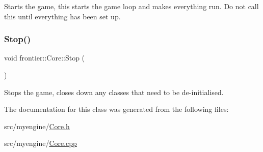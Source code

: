 Starts the game, this starts the game loop and makes everything run. Do not call this until everything has been set up. 

\mbox{\label{classfrontier_1_1_core_af73d19f41d8316a7e0a6e11137201ed9}} 
\subsubsection{\texorpdfstring{Stop()}{Stop()}}
{\footnotesize\ttfamily void frontier\+::\+Core\+::\+Stop (\begin{DoxyParamCaption}{ }\end{DoxyParamCaption})}



Stops the game, closes down any classes that need to be de-\/initialised. 



The documentation for this class was generated from the following files\+:\begin{DoxyCompactItemize}
\item 
src/myengine/\hyperlink{_core_8h}{Core.\+h}\item 
src/myengine/\hyperlink{_core_8cpp}{Core.\+cpp}\end{DoxyCompactItemize}
